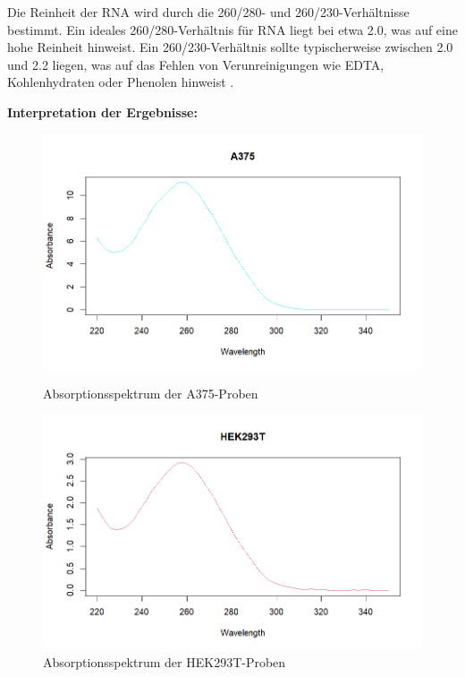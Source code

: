 \documentclass{article}
\begin{document}
Die Reinheit der RNA wird durch die 260/280- und 260/230-Verhältnisse bestimmt. Ein ideales 260/280-Verhältnis für RNA liegt bei etwa 2.0, was auf eine hohe Reinheit hinweist. Ein 260/230-Verhältnis sollte typischerweise zwischen 2.0 und 2.2 liegen, was auf das Fehlen von Verunreinigungen wie EDTA, Kohlenhydraten oder Phenolen hinweist \cite{ThermoFisher260280, ThermoFisherQuantitatingRNA}.

\textbf{Interpretation der Ergebnisse:}
\begin{figure}[H]
    \centering
    \begin{minipage}[H]{0.45\textwidth}
      \centering
      \includegraphics[width=\textwidth]{images/a3751.png}
      \caption{Absorptionsspektrum der A375-Proben}
      \label{fig:a3751}
    \end{minipage}
    \hfill
    \begin{minipage}[H]{0.45\textwidth}
      \centering
      \includegraphics[width=\textwidth]{images/hek1.png}
      \caption{Absorptionsspektrum der HEK293T-Proben}
      \label{fig:hek1}
    \end{minipage}
  \end{figure}
\end{document}
